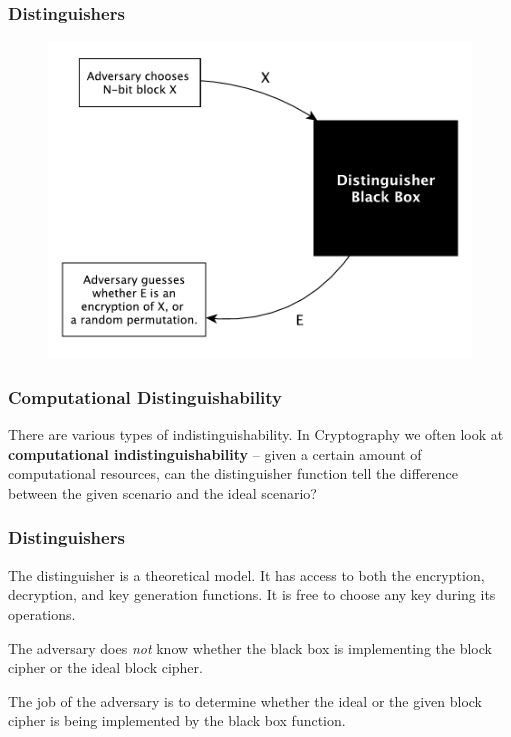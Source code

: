 \documentclass{beamer}
\newcommand{\<}{\langle}
\renewcommand{\>}{\rangle}
\begin{document}
\begin{frame}
\frametitle{Distinguishers}

\begin{figure}
\includegraphics[scale=.5]{IMG/blackboxdist}
\end{figure}
\end{frame}

\begin{frame}
\frametitle{Computational Distinguishability}

There are various types of indistinguishability. In Cryptography we often look at \textbf{computational indistinguishability} -- given a certain amount of computational resources, can the distinguisher function tell the difference between the given scenario and the ideal scenario?
\end{frame}


\begin{frame}
\frametitle{Distinguishers}

The distinguisher is a theoretical model. It has access to both the encryption, decryption, and key generation functions. It is free to choose any key during its operations. \newline

The adversary does \emph{not} know whether the black box is implementing the block cipher or the ideal block cipher. \newline

The job of the adversary is to determine whether the ideal or the given block cipher is being implemented by the black box function.
\end{frame}
\end{document}

